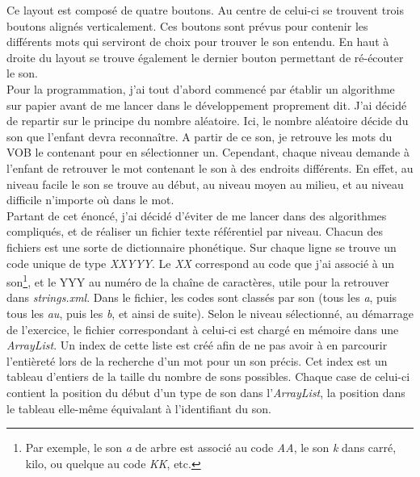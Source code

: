 Ce layout est composé de quatre boutons. Au centre de celui-ci se trouvent trois boutons alignés verticalement. Ces boutons sont prévus pour contenir les différents mots qui serviront de choix pour trouver le son entendu. En haut à droite du layout se trouve également le dernier bouton permettant de ré-écouter le son.\\

Pour la programmation, j'ai tout d'abord commencé par établir un algorithme sur papier avant de me lancer dans le développement proprement dit. J'ai décidé de repartir sur le principe du nombre aléatoire. Ici, le nombre aléatoire décide du son que l'enfant devra reconnaître. A partir de ce son, je retrouve les mots du VOB le contenant pour en sélectionner un. Cependant, chaque niveau demande à l'enfant de retrouver le mot contenant le son à des endroits différents. En effet, au niveau facile le son se trouve au début, au niveau moyen au milieu, et au niveau difficile n'importe où dans le mot.\\

Partant de cet énoncé, j'ai décidé d'éviter de me lancer dans des algorithmes compliqués, et de réaliser un fichier texte référentiel par niveau. Chacun des fichiers est une sorte de dictionnaire phonétique. Sur chaque ligne se trouve un code unique de type \textit{XXYYY}. Le \textit{XX} correspond au code que j'ai associé à un son\footnote{Par exemple, le son \textit{a} de arbre est associé au code \textit{AA}, le son \textit{k} dans carré, kilo, ou quelque au code \textit{KK}, etc.}, et le YYY au numéro de la chaîne de caractères, utile pour la retrouver dans \textit{strings.xml}. Dans le fichier, les codes sont classés par son (tous les \textit{a}, puis tous les \textit{au}, puis les \textit{b}, et ainsi de suite). Selon le niveau sélectionné, au démarrage de l'exercice, le fichier correspondant à celui-ci est chargé en mémoire dans une \textit{ArrayList}. Un index de cette liste est créé afin de ne pas avoir à en parcourir l'entièreté lors de la recherche d'un mot pour un son précis. Cet index est un tableau d'entiers de la taille du nombre de sons possibles. Chaque case de celui-ci contient la position du début d'un type de son dans l'\textit{ArrayList}, la position dans le tableau elle-même équivalant à l'identifiant du son.\\

